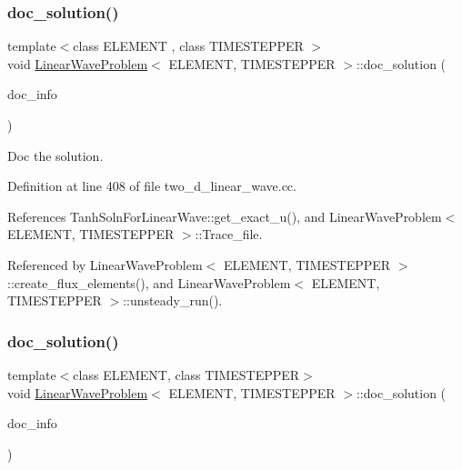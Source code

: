 \mbox{\label{classLinearWaveProblem_a6d9396a693be0479ece9ac1f14f9233a}} 
\subsubsection{\texorpdfstring{doc\+\_\+solution()}{doc\_solution()}\hspace{0.1cm}{\footnotesize\ttfamily [1/2]}}
{\footnotesize\ttfamily template$<$class E\+L\+E\+M\+E\+NT , class T\+I\+M\+E\+S\+T\+E\+P\+P\+ER $>$ \\
void \hyperlink{classLinearWaveProblem}{Linear\+Wave\+Problem}$<$ E\+L\+E\+M\+E\+NT, T\+I\+M\+E\+S\+T\+E\+P\+P\+ER $>$\+::doc\+\_\+solution (\begin{DoxyParamCaption}\item[{Doc\+Info \&}]{doc\+\_\+info }\end{DoxyParamCaption})}



Doc the solution. 



Definition at line 408 of file two\+\_\+d\+\_\+linear\+\_\+wave.\+cc.



References Tanh\+Soln\+For\+Linear\+Wave\+::get\+\_\+exact\+\_\+u(), and Linear\+Wave\+Problem$<$ E\+L\+E\+M\+E\+N\+T, T\+I\+M\+E\+S\+T\+E\+P\+P\+E\+R $>$\+::\+Trace\+\_\+file.



Referenced by Linear\+Wave\+Problem$<$ E\+L\+E\+M\+E\+N\+T, T\+I\+M\+E\+S\+T\+E\+P\+P\+E\+R $>$\+::create\+\_\+flux\+\_\+elements(), and Linear\+Wave\+Problem$<$ E\+L\+E\+M\+E\+N\+T, T\+I\+M\+E\+S\+T\+E\+P\+P\+E\+R $>$\+::unsteady\+\_\+run().

\mbox{\label{classLinearWaveProblem_a6d9396a693be0479ece9ac1f14f9233a}} 
\subsubsection{\texorpdfstring{doc\+\_\+solution()}{doc\_solution()}\hspace{0.1cm}{\footnotesize\ttfamily [2/2]}}
{\footnotesize\ttfamily template$<$class E\+L\+E\+M\+E\+NT, class T\+I\+M\+E\+S\+T\+E\+P\+P\+ER$>$ \\
void \hyperlink{classLinearWaveProblem}{Linear\+Wave\+Problem}$<$ E\+L\+E\+M\+E\+NT, T\+I\+M\+E\+S\+T\+E\+P\+P\+ER $>$\+::doc\+\_\+solution (\begin{DoxyParamCaption}\item[{Doc\+Info \&}]{doc\+\_\+info }\end{DoxyParamCaption})}



